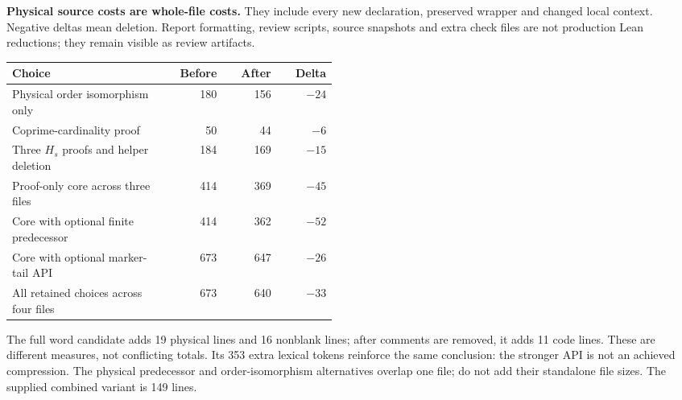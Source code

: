 \textbf{Physical source costs are whole-file costs.} They include every new declaration, preserved wrapper and changed local context. Negative deltas mean deletion. Report formatting, review scripts, source snapshots and extra check files are not production Lean reductions; they remain visible as review artifacts.

\begin{tabular}{@{}L{0.47\linewidth}rrr@{}}\toprule
Choice & Before & After & Delta\\\midrule
Physical order isomorphism only & 180 & 156 & $-24$\\
Coprime-cardinality proof & 50 & 44 & $-6$\\
Three $H_s$ proofs and helper deletion & 184 & 169 & $-15$\\\midrule
Proof-only core across three files & 414 & 369 & $-45$\\
Core with optional finite predecessor & 414 & 362 & $-52$\\
Core with optional marker-tail API & 673 & 647 & $-26$\\
All retained choices across four files & 673 & 640 & $-33$\\\bottomrule
\end{tabular}

The full word candidate adds 19 physical lines and 16 nonblank lines; after comments are removed, it adds 11 code lines. These are different measures, not conflicting totals. Its 353 extra lexical tokens reinforce the same conclusion: the stronger API is not an achieved compression. The physical predecessor and order-isomorphism alternatives overlap one file; do not add their standalone file sizes. The supplied combined variant is 149 lines.

